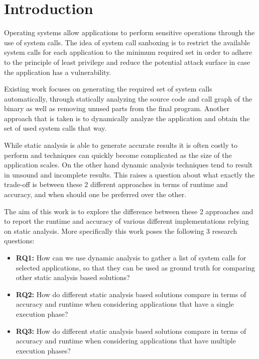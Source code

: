 \section{Introduction}
Operating systems allow applications to perform sensitive operations through the use of system calls. The idea of system call sanboxing is to restrict the available system calls for each application to the minimum required set in order to adhere to the principle of least privilege and reduce the potential attack surface in case the application has a vulnerability.

Existing work focuses on generating the required set of system calls automatically, through statically analyzing the source code and call graph of the binary as well as removing unused parts from the final program. %
Another approach that is taken is to dynamically analyze the application and obtain the set of used system calls that way. %

While static analysis is able to generate accurate results it is often costly to perform and techniques can quickly become complicated as the size of the application scales. %
On the other hand dynamic analysis techniques tend to result in unsound and incomplete results. %
This raises a question about what exactly the trade-off is between these 2 different approaches in terms of runtime and accuracy, and when should one be preferred over the other.

The aim of this work is to explore the difference between these 2 approaches and to report the runtime and accuracy of various different implementations relying on static analysis.
More specifically this work poses the following 3 research questions:
\begin{itemize}
    \item{\textbf{RQ1:} How can we use dynamic analysis to gather a list of system calls for selected applications, so that they can be used as ground truth for comparing other static analysis based solutions?}
    \item{\textbf{RQ2:} How do different static analysis based solutions compare in terms of accuracy and runtime when considering applications that have a single execution phase?}
    \item{\textbf{RQ3:} How do different static analysis based solutions compare in terms of accuracy and runtime when considering applications that have multiple execution phases?}
\end{itemize}

